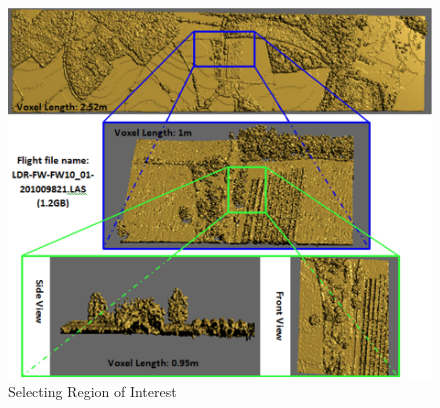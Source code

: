 \documentclass{subfiles}
\begin{document}
 \begin{figure} [h!]
 	\centering
 	\includegraphics[width=.8\textwidth]{img/SelectingRegionOfInterest}
 	\caption[Selecting Region of Interest]{Selecting Region of Interest}
 	\label{fig:SelectingRegionOfInterest}
 \end{figure}
 

 

  
\end{document}
